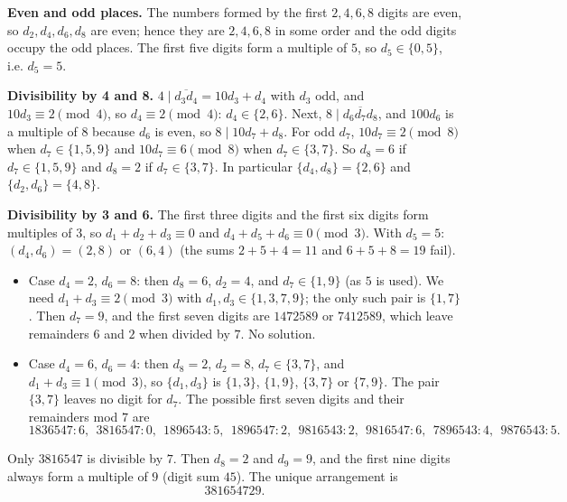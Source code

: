 \textbf{Even and odd places.} The numbers formed by the first $2,4,6,8$ digits are even, so $d_2,d_4,d_6,d_8$ are even; hence they are $2,4,6,8$ in some order and the odd digits occupy the odd places. The first five digits form a multiple of $5$, so $d_5\in\{0,5\}$, i.e. $d_5=5$.

\textbf{Divisibility by 4 and 8.} $4\mid\overline{d_3d_4}=10d_3+d_4$ with $d_3$ odd, and $10d_3\equiv2\pmod4$, so $d_4\equiv2\pmod4$: $d_4\in\{2,6\}$. Next, $8\mid\overline{d_6d_7d_8}$, and $100d_6$ is a multiple of $8$ because $d_6$ is even, so $8\mid10d_7+d_8$. For odd $d_7$, $10d_7\equiv2\pmod8$ when $d_7\in\{1,5,9\}$ and $10d_7\equiv6\pmod8$ when $d_7\in\{3,7\}$. So $d_8=6$ if $d_7\in\{1,5,9\}$ and $d_8=2$ if $d_7\in\{3,7\}$. In particular $\{d_4,d_8\}=\{2,6\}$ and $\{d_2,d_6\}=\{4,8\}$.

\textbf{Divisibility by 3 and 6.} The first three digits and the first six digits form multiples of $3$, so $d_1+d_2+d_3\equiv0$ and $d_4+d_5+d_6\equiv0\pmod3$. With $d_5=5$: $(d_4,d_6)=(2,8)$ or $(6,4)$ (the sums $2+5+4=11$ and $6+5+8=19$ fail).
\begin{itemize}
\item Case $d_4=2$, $d_6=8$: then $d_8=6$, $d_2=4$, and $d_7\in\{1,9\}$ (as $5$ is used). We need $d_1+d_3\equiv2\pmod3$ with $d_1,d_3\in\{1,3,7,9\}$; the only such pair is $\{1,7\}$. Then $d_7=9$, and the first seven digits are $1472589$ or $7412589$, which leave remainders $6$ and $2$ when divided by $7$. No solution.
\item Case $d_4=6$, $d_6=4$: then $d_8=2$, $d_2=8$, $d_7\in\{3,7\}$, and $d_1+d_3\equiv1\pmod3$, so $\{d_1,d_3\}$ is $\{1,3\}$, $\{1,9\}$, $\{3,7\}$ or $\{7,9\}$. The pair $\{3,7\}$ leaves no digit for $d_7$. The possible first seven digits and their remainders mod $7$ are
\[1836547:6,\ \ 3816547:0,\ \ 1896543:5,\ \ 1896547:2,\ \ 9816543:2,\ \ 9816547:6,\ \ 7896543:4,\ \ 9876543:5.\]
\end{itemize}
Only $3816547$ is divisible by $7$. Then $d_8=2$ and $d_9=9$, and the first nine digits always form a multiple of $9$ (digit sum $45$). The unique arrangement is
\[\boxed{381654729}.\]
